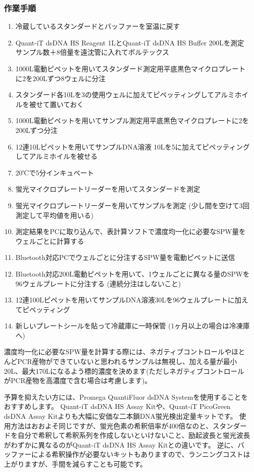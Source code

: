 \documentclass[titlepage,10pt,a4paper,uplatex]{jsbook}
\begin{document}
\subsubsection{作業手順}
\begin{enumerate}
\item 冷蔵しているスタンダードとバッファーを室温に戻す
\item Quant-iT dsDNA HS Reagent 1{\textmu}LとQuant-iT dsDNA HS Buffer 200{\textmu}Lを測定サンプル数＋8倍量を遠沈管に入れてボルテックス
\item 1000{\textmu}L電動ピペットを用いてスタンダード測定用平底黒色マイクロプレートに2を200{\textmu}Lずつ8ウェルに分注
\item スタンダード各10{\textmu}Lを3の使用ウェルに加えてピペッティングしてアルミホイルを被せて置いておく
\item 1000{\textmu}L電動ピペットを用いてサンプル測定用平底黒色マイクロプレートに2を200{\textmu}Lずつ分注
\item 12連10{\textmu}Lピペットを用いてサンプルDNA溶液 10{\textmu}Lを5に加えてピペッティングしてアルミホイルを被せる
\item 20℃で5分インキュベート
\item 蛍光マイクロプレートリーダーを用いてスタンダードを測定
\item 蛍光マイクロプレートリーダーを用いてサンプルを測定 (少し間を空けて3回測定して平均値を用いる)
\item 測定結果をPCに取り込んで、表計算ソフトで濃度均一化に必要なSPW量をウェルごとに計算する
\item Bluetooth対応PCでウェルごとに分注するSPW量を電動ピペットに送信
\item Bluetooth対応200{\textmu}L電動ピペットを用いて、1ウェルごとに異なる量のSPWを96ウェルプレートに分注する (連続分注はしないこと)
\item 12連100{\textmu}Lピペットを用いてサンプルDNA溶液30{\textmu}Lを96ウェルプレートに加えてピペッティング
\item 新しいプレートシールを貼って冷蔵庫に一時保管 (1ヶ月以上の場合は冷凍庫へ)
\end{enumerate}

濃度均一化に必要なSPW量を計算する際には、ネガティブコントロールやほとんどPCR産物ができていないと思われるサンプルは無視し、加える量が最小20{\textmu}L、最大170{\textmu}Lになるよう標的濃度を決めます(ただしネガティブコントロールがPCR産物を高濃度で含む場合は考慮します)。

予算を抑えたい方には、Promega QuantiFluor dsDNA Systemを使用することをおすすめします。
Quant-iT dsDNA HS Assay Kitや、Quant-iT PicoGreen dsDNA Assay Kitよりも大幅に安価な二本鎖DNA蛍光検出定量キットです。
使用方法はおおよそ同じですが、蛍光色素の希釈倍率が400倍なのと、スタンダードを自分で希釈して希釈系列を作成しないといけないこと、励起波長と蛍光波長がわずかに異なるのがQuant-iT dsDNA HS Assay Kitとの違いです。
逆に、バッファーによる希釈操作が必要ないキットもありますので、ランニングコストは上がりますが、手間を減らすことも可能です。
\end{document}
